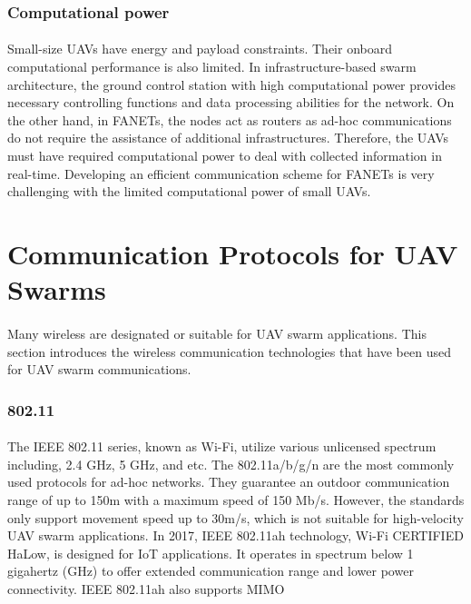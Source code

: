 \documentclass[a4paper,12pt]{report}
\begin{document}
\subsubsection{Computational power}
\paragraph{}
Small-size UAVs have energy and payload constraints. Their onboard computational performance is also limited. In infrastructure-based swarm architecture, the ground control station with high computational power provides necessary controlling functions and data processing abilities for the network. On the other hand, in FANETs, the nodes act as routers as ad-hoc communications do not require the assistance of additional infrastructures. Therefore, the UAVs must have required computational power to deal with collected information in real-time. Developing an efficient communication scheme for FANETs is very challenging with the limited computational power of small UAVs.

\section{Communication Protocols for UAV Swarms}
\paragraph{}
Many wireless are designated or suitable for UAV swarm applications. This section introduces the wireless communication technologies that have been used for UAV swarm communications.

\subsubsection{802.11}
\paragraph{}
The IEEE 802.11 series, known as Wi-Fi, utilize various unlicensed spectrum including, 2.4 GHz, 5 GHz, and etc. The 802.11a/b/g/n are the most commonly used protocols for ad-hoc networks. They guarantee an outdoor communication range of up to 150m with a maximum speed of 150 Mb/s. However, the standards only support movement speed up to 30m/s, which is not suitable for high-velocity UAV swarm applications\cite{chen2020toward}. In 2017, IEEE 802.11ah technology, Wi-Fi CERTIFIED HaLow, is designed for IoT applications. It operates in spectrum below 1 gigahertz (GHz) to offer extended communication range and lower power connectivity. IEEE 802.11ah also supports MIMO\cite{Shi_2021}
\end{document}
